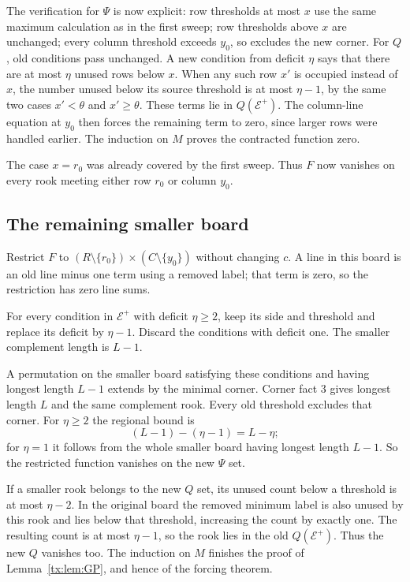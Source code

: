 \documentclass[11pt,a4paper,oneside,openany]{book}
\theoremstyle{definition}\newtheorem{definition}[theorem]{Definition}
\theoremstyle{remark}\newtheorem{remark}[theorem]{Remark}
\numberwithin{equation}{chapter}
\begin{document}
The verification for $\Psi$ is now explicit: row thresholds at most $x$ use the same maximum calculation as in the first sweep; row thresholds above $x$ are unchanged; every column threshold exceeds $y_0$, so excludes the new corner. For $Q$, old conditions pass unchanged. A new condition from deficit $\eta$ says that there are at most $\eta$ unused rows below $x$. When any such row $x'$ is occupied instead of $x$, the number unused below its source threshold is at most $\eta-1$, by the same two cases $x'<\theta$ and $x'\ge\theta$. These terms lie in $Q(\mathcal E^+)$. The column-line equation at $y_0$ then forces the remaining term to zero, since larger rows were handled earlier. The induction on $M$ proves the contracted function zero.

The case $x=r_0$ was already covered by the first sweep. Thus $F$ now vanishes on every rook meeting either row $r_0$ or column $y_0$.

\subsection{The remaining smaller board}
Restrict $F$ to $(R\setminus\{r_0\})\times(C\setminus\{y_0\})$ without changing $c$. A line in this board is an old line minus one term using a removed label; that term is zero, so the restriction has zero line sums.

For every condition in $\mathcal E^+$ with deficit $\eta\ge2$, keep its side and threshold and replace its deficit by $\eta-1$. Discard the conditions with deficit one. The smaller complement length is $L-1$.

A permutation on the smaller board satisfying these conditions and having longest length $L-1$ extends by the minimal corner. Corner fact 3 gives longest length $L$ and the same complement rook. Every old threshold excludes that corner. For $\eta\ge2$ the regional bound is
\[(L-1)-(\eta-1)=L-\eta;
\]
for $\eta=1$ it follows from the whole smaller board having longest length $L-1$. So the restricted function vanishes on the new $\Psi$ set.

If a smaller rook belongs to the new $Q$ set, its unused count below a threshold is at most $\eta-2$. In the original board the removed minimum label is also unused by this rook and lies below that threshold, increasing the count by exactly one. The resulting count is at most $\eta-1$, so the rook lies in the old $Q(\mathcal E^+)$. Thus the new $Q$ vanishes too. The induction on $M$ finishes the proof of Lemma~\ref{tx:lem:GP}, and hence of the forcing theorem.
\end{document}
